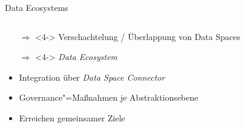\begin{frame}{Data Ecosystems \footnotesize\cite{mollerIndustrialDataEcosystems2024}}
\begin{columns}
\begin{column}{0.6\textwidth}
\begin{itemize}
                \item[$\Rightarrow$]<4-> Verschachtelung / Überlappung von Data Spaces
                \item[$\Rightarrow$]<4-> \alert{\emph{Data Ecosystem}}
                

                
                \item<5-> Integration über \emph{Data Space Connector}
                \item<5-> Governance"=Maßnahmen je Abstraktionsebene
                \item<5-> Erreichen gemeinsamer Ziele
                

\end{itemize}
\end{column}
\end{columns}
\end{frame}
